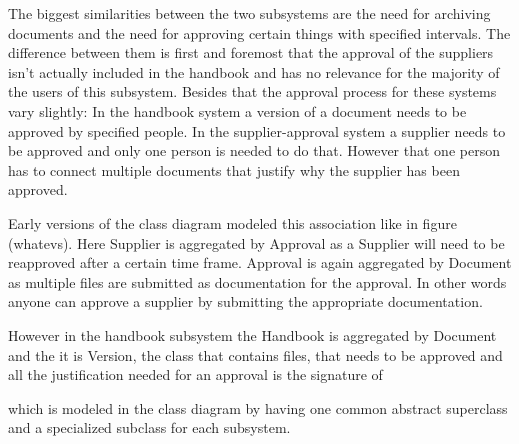 The biggest similarities between the two subsystems are the need for archiving documents and the need for approving certain things with specified intervals.
The difference between them is first and foremost that the approval of the suppliers isn't actually included in the handbook and has no relevance for the majority of the users of this subsystem. Besides that the approval process for these systems vary slightly:
In the handbook system a version of a document needs to be approved by specified people.
In the supplier-approval system a supplier needs to be approved and only one person is needed to do that.
However that one person has to connect multiple documents that justify why the supplier has been approved.

Early versions of the class diagram modeled this association like in figure {\color{red}(whatevs)}. Here Supplier is aggregated by Approval as a Supplier will need to be reapproved after a certain time frame. Approval is again aggregated by Document as multiple files are submitted as documentation for the approval. In other words anyone can approve a supplier by submitting the appropriate documentation.

However in the handbook subsystem the Handbook is aggregated by Document and the
it is Version, the class that contains files, that needs to be approved and all the justification needed for an approval is the signature of



 which is modeled in the class diagram by having one common abstract superclass and a specialized subclass for each subsystem.
